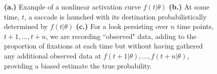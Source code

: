 \documentclass{article}
\begin{document}
\begin{figure}[H]
    \centering
    \caption{ \textbf{(a.)} Example of a nonlinear activation curve $f(t|\theta)$ \textbf{(b.)} At some time, $t$, a saccade is launched with its destination probabilistically determined by $f(t|\theta)$ \textbf{(c.)} For a look persisting over $n$ time points, $t+1, \dots, t+n$, we are recording ``observed" data, adding to the proportion of fixations at each time but without having gathered any additional observed data at $f(t+1 | \theta), \dots,f(t+n | \theta)$, providing a biased estimate the true probability. }
\label{fig:folly_of_fixation}
\end{figure}
\end{document}
